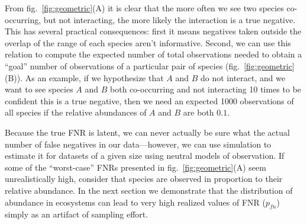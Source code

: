\documentclass[10pt,oneside]{article}
\begin{document}
From fig.~\ref{fig:geometric}(A) it is clear that the more often we see
two species co-occurring, but not interacting, the more likely the
interaction is a true negative. This has several practical consequences:
first it means negatives taken outside the overlap of the range of each
species aren't informative. Second, we can use this relation to compute
the expected number of total observations needed to obtain a ``goal''
number of observations of a particular pair of species
(fig.~\ref{fig:geometric}(B)). As an example, if we hypothesize that
\(A\) and \(B\) do not interact, and we want to see species \(A\) and
\(B\) both co-occurring and not interacting 10 times to be confident
this is a true negative, then we need an expected 1000 observations of
all species if the relative abundances of \(A\) and \(B\) are both
\(0.1\).

Because the true FNR is latent, we can never actually be sure what the
actual number of false negatives in our data---however, we can use
simulation to estimate it for datasets of a given size using neutral
models of observation. If some of the ``worst-case'' FNRs presented in
fig.~\ref{fig:geometric}(A) seem unrealistically high, consider that
species are observed in proportion to their relative abundance. In the
next section we demonstrate that the distribution of abundance in
ecosystems can lead to very high realized values of FNR (\(p_{fn}\))
simply as an artifact of sampling effort.
\end{document}
